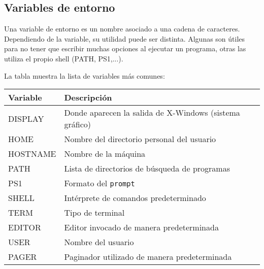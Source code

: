 \documentclass[12pt]{article}
\begin{document}


\subsection{Variables de entorno}

Una variable de entorno es un nombre asociado a una cadena de caracteres. Dependiendo de la variable, su utilidad puede ser distinta. 
Algunas son útiles para no tener que escribir muchas opciones al ejecutar un programa, otras las utiliza el propio shell (PATH, PS1,...). 

La tabla muestra la lista de variables más comunes:

\begin{center}
\begin{tabular}{|l|l|}\hline
\rowcolor{tcA}
Variable & Descripción \\\hline
DISPLAY & Donde aparecen la salida de X-Windows (sistema gráfico)\\\hline
HOME & Nombre del directorio personal del usuario\\\hline
HOSTNAME & Nombre de la máquina\\\hline
PATH & Lista de directorios de búsqueda de programas\\\hline
PS1 & Formato del \texttt{prompt}\\\hline
SHELL & Intérprete de comandos predeterminado\\\hline
TERM & Tipo de terminal\\\hline
EDITOR & Editor invocado de manera predeterminada\\\hline
USER & Nombre del usuario\\\hline
PAGER & Paginador utilizado de manera predeterminada\\\hline
\end{tabular}
\end{center}
\end{document}
